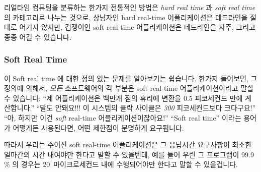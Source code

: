 리얼타임 컴퓨팅을 분류하는 한가지 전통적인 방법은 \emph{hard real time} 과
\emph{soft real time} 의 카테고리로 나누는 것으로, 상남자인 hard real-time
어플리케이션은 데드라인을 절대로 어기지 않지만, 겁쟁이인 soft real-time
어플리케이션은 데드라인을 자주, 그리고 종종 어길 수 있습니다.

\subsubsection{Soft Real Time}
\label{sec:Soft Real Time}

이 Soft real time 에 대한 정의 있는 문제를 알아보기는 쉽습니다.
한가지 들어보면, 그 정의에 의해서, \emph{모든} 소프트웨어의 각 부분은 soft
real-time 어플리케이션이라고 말할 수 있습니다:
``제 어플리케이션은 백만개 점의 휴리에 변환을 0.5 피코세컨드 만에 계산합니다.''
``말도 안돼요!!!
이 시스템의 클락 사이클은 \emph{300} 피코세컨드보다 크다구요!''
``아, 하지만 이건 \emph{soft} real-time 어플리케이션이잖아요!''
``Soft real time'' 이라는 용어가 어떻게든 사용된다면, 어떤 제한점이 분명하게
요구됩니다.

따라서 우리는 주어진 soft real-time 어플리케이션은 그 응답시간 요구사항이
최소한 얼마간의 시간 내여야만 한다고 말할 수 있을텐데, 예를 들어 우린 그
프로그램이 99.9\,\% 의 경우는 20~마이크로세컨드 내에 수행되어야만 한다고 말할 수
있을겁니다.


